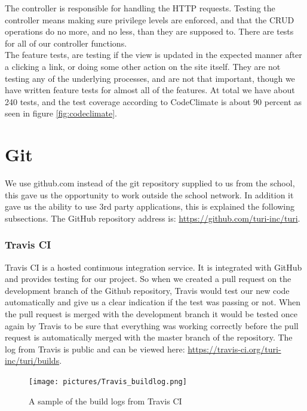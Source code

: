 \documentclass[a4paper]{article}
\begin{document}
\noindent
The controller is responsible for handling the HTTP requests. Testing the controller means making sure privilege levels are enforced, and that the CRUD operations do no more, and no less, than they are supposed to. There are tests for all of our controller functions.
\\

\noindent
The feature tests, are testing if the view is updated in the expected manner after a clicking a link, or doing some other action on the site itself. They are not testing any of the underlying processes, and are not that important, though we have written feature tests for almost all of the features. 
At total we have about 240 tests, and the test coverage according to CodeClimate is about 90 percent as seen in figure \ref{fig:codeclimate}.
\\

\section{Git}
We use github.com instead of the git repository supplied to us from the school, this gave us the opportunity to work outside the school network. In addition it gave us the ability to use 3rd party applications, this is explained the following subsections. The GitHub repository address is: \url{https://github.com/turi-inc/turi}.

\subsubsection{Travis CI}
Travis CI is a hosted continuous integration service. It is integrated with GitHub and provides testing for our project. So when we created a pull request on the development branch of the Github repository, Travis would test our new code automatically and give us a clear indication if the test was passing or not. When the pull request is merged with the development branch it would be tested once again by Travis to be sure that everything was working correctly before the pull request is automatically merged with the master branch of the repository. The log from Travis is public and can be viewed here: \url{https://travis-ci.org/turi-inc/turi/builds}.

\begin{figure}[!h]
  \begin{center}
    \texttt{[image: pictures/Travis\_buildlog.png]}
    \caption{A sample of the build logs from Travis CI}
    \label{fig:travis_log}
  \end{center}
\end{figure}
\end{document}
